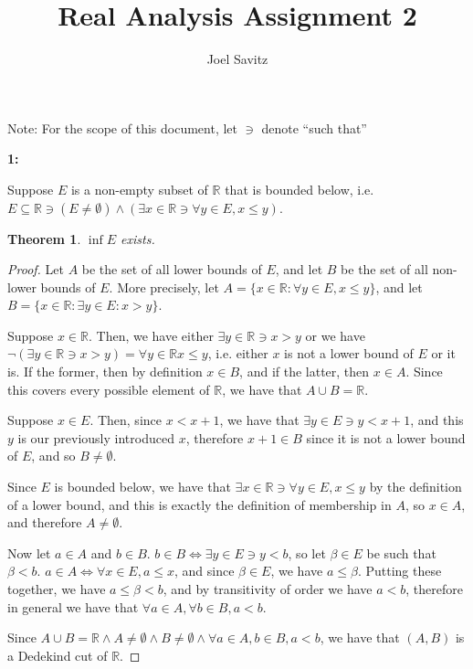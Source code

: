 \documentclass{article}
\title{Real Analysis Assignment 2}
\author{Joel Savitz}
\newcommand{\reals}{\mathbb{R}}
\newtheorem{thm}{Theorem}
\begin{document}
\maketitle

Note: For the scope of this document, let $\ni$ denote ``such that''

\textbf{1:}

Suppose $E$ is a non-empty subset of $\reals$ that is bounded below,
i.e. $E \subseteq \reals \ni (E \neq \emptyset) \land (\exists x \in \reals \ni \forall y \in E, x \le y)$.

\begin{thm} \label{thm1}
	$\inf E$ exists.
\end{thm}

\begin{proof}
	Let $A$ be the set of all lower bounds of $E$,
	and let $B$ be the set of all non-lower bounds of $E$.
	More precisely,
	let $A = \{ x \in \reals: \forall y \in E, x \le y \}$,
	and let $B = \{x \in \reals: \exists y \in E: x > y \}$.

	Suppose $x \in \reals$. Then,
	we have either $\exists y \in \reals \ni x > y$
	or we have $\neg (\exists y \in \reals \ni x > y) = \forall y \in \reals x \le y$,
	i.e. either $x$ is not a lower bound of $E$ or it is.
	If the former, then by definition $x \in B$,
	and if the latter, then $x \in A$.
	Since this covers every possible element of $\reals$,
	we have that $A \cup B = \reals$.

	Suppose $x \in E$.
	Then, since $x < x + 1$,
	we have that $\exists y \in E \ni y < x + 1$,
	and this $y$ is our previously introduced $x$,
	therefore $x + 1 \in B$ since it is not a lower bound of $E$,
	and so $B \neq \emptyset$.

	Since $E$ is bounded below,
	we have that $\exists x \in \reals \ni \forall y \in E, x \le y$
	by the definition of a lower bound,
	and this is exactly the definition of membership in $A$, so $x \in A$,
	and therefore $A \neq \emptyset$.

	Now let $a \in A$ and $b \in B$.
	$b \in B \iff \exists y \in E \ni y < b$,
	so let $\beta \in E$ be such that $\beta < b$.
	$a \in A \iff \forall x \in E, a \le x$,
	and since $\beta \in E$, we have $a \le \beta$.
	Putting these together, we have $a \le \beta < b$,
	and by transitivity of order we have $a < b$,
	therefore in general we have that
	$\forall a \in A, \forall b \in B, a < b$.

	Since $A \cup B = \reals \land A \neq \emptyset \land B \neq \emptyset \land
	\forall a \in A, b \in B, a < b$,
	we have that $(A,B)$ is a Dedekind cut of $\reals$.


\end{proof}
\end{document}
